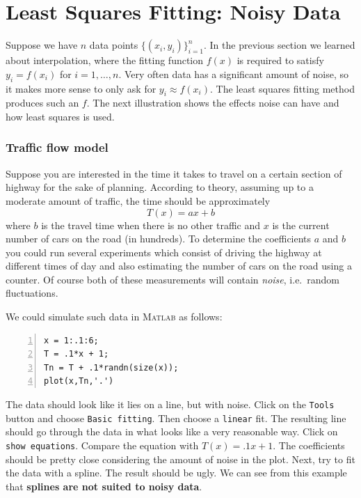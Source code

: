 
\chapter{Least Squares Fitting:  Noisy Data}
\label{sec:leastsquares}

Suppose we have \(n\) data points \(\{(x_i,y_i)\}_{i=1}^n\).
In the previous section we learned about interpolation, where the
fitting function \(f(x)\) is required to satisfy  
\(y_i=f(x_i)\) for \(i=1,\dots,n\).
%
Very often  data has a significant amount of noise, so it makes more
sense to only ask for \(y_i\approx f(x_i)\).
The least squares fitting method produces such an \(f\). 
The next illustration shows the effects
noise can have and how least squares is used.


\subsection*{Traffic flow model}

Suppose you are interested in the time it takes to travel on a certain
section of highway for the sake of planning. According to theory,
assuming up to a moderate amount of traffic, the time should be
approximately
$$
     T(x) = ax + b
$$
where $b$ is the travel time when there is no other traffic and $x$ is
the current number of cars on the road (in hundreds). To determine the
coefficients $a$ and $b$ you could run several experiments which consist
of driving the highway at different times of day and also estimating the number
of cars on the road using a counter. Of course both of these measurements
will contain {\em noise}, i.e.\ random fluctuations.

We could simulate such data in \textsc{Matlab} as follows:
\begin{lstlisting}[frame=none,numbers=left]
x = 1:.1:6;
T = .1*x + 1;
Tn = T + .1*randn(size(x));
plot(x,Tn,'.')
\end{lstlisting}
The data should look like it lies on a line, but with noise.
Click on the \verb&Tools& button and choose \verb&Basic fitting&.
Then choose a \verb&linear& fit. The resulting line should go through the
data in what looks like a very reasonable way. Click on \verb&show equations&.
Compare the equation with $T(x) = .1 x + 1$. The coefficients should
be pretty close considering the amount of noise in the plot.
Next, try to fit the data with a spline. The result should be ugly.
We can see from this example that {\bf splines are not suited to noisy data}.

